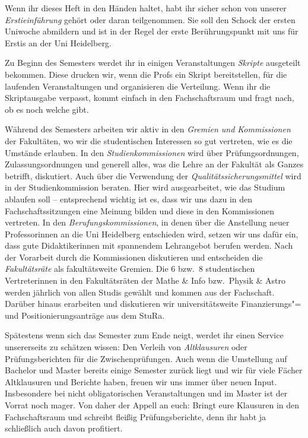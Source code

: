 Wenn ihr dieses Heft in den Händen haltet, habt ihr sicher schon von unserer \emph{Erstieinführung} gehört oder daran teilgenommen. Sie soll den Schock der ersten Uniwoche abmildern und ist in der Regel der erste Berührungspunkt mit uns für Erstis an der Uni Heidelberg.

Zu Beginn des Semesters werdet ihr in einigen Veranstaltungen \emph{Skripte} ausgeteilt bekommen. Diese drucken wir, wenn die Profs ein Skript bereitstellen, für die laufenden Veranstaltungen und organisieren die Verteilung. Wenn ihr die Skriptausgabe verpasst, kommt einfach in den Fachschaftsraum und fragt nach, ob es noch welche gibt.

Während des Semesters arbeiten wir aktiv in den \emph{Gremien und Kommissionen} der Fakultäten, wo wir die studentischen Interessen so gut vertreten, wie es die Umstände erlauben. In den \emph{Studienkommissionen} wird über Prüfungsordnungen, Zulassungsordnungen und generell alles, was die Lehre an der Fakultät als Ganzes betrifft, diskutiert. Auch über die Verwendung der \emph{Qualitätssicherungsmittel} wird in der Studienkommission beraten. Hier wird ausgearbeitet, wie das Studium ablaufen soll -- entsprechend wichtig ist es, dass wir uns dazu in den Fachschaftssitzungen eine Meinung bilden und diese in den Kommissionen vertreten. In den \emph{Berufungskommissionen}, in denen über die Anstellung neuer Professorinnen an die Uni Heidelberg entschieden wird, setzen wir uns dafür ein, dass gute Didaktikerinnen mit spannendem Lehrangebot berufen werden. Nach der Vorarbeit durch die Kommissionen diskutieren und entscheiden die \emph{Fakultätsräte} als fakultätsweite Gremien. Die 6 bzw.~8 studentischen Vertreterinnen in den Fakultätsräten der Mathe \& Info bzw.~Physik \& Astro werden jährlich von allen Studis gewählt und kommen aus der Fachschaft. Darüber hinaus erarbeiten und diskutieren wir universitätsweite Finanzierungs"= und Positionierungsanträge aus dem \gls{StuRa}.

Spätestens wenn sich das Semester zum Ende neigt, werdet ihr einen Service unsererseits zu schätzen wissen: Den Verleih von \emph{Altklausuren} oder Prüfungsberichten für die Zwischenprüfungen. Auch wenn die Umstellung auf Bachelor und Master bereits einige Semester zurück liegt und wir für viele Fächer Altklausuren und Berichte haben, freuen wir uns immer über neuen Input. Insbesondere bei nicht obligatorischen Veranstaltungen und im Master ist der Vorrat noch mager. Von daher der Appell an euch: Bringt eure Klausuren in den Fachschaftsraum und schreibt fleißig Prüfungsberichte, denn ihr habt ja schließlich auch davon profitiert.



